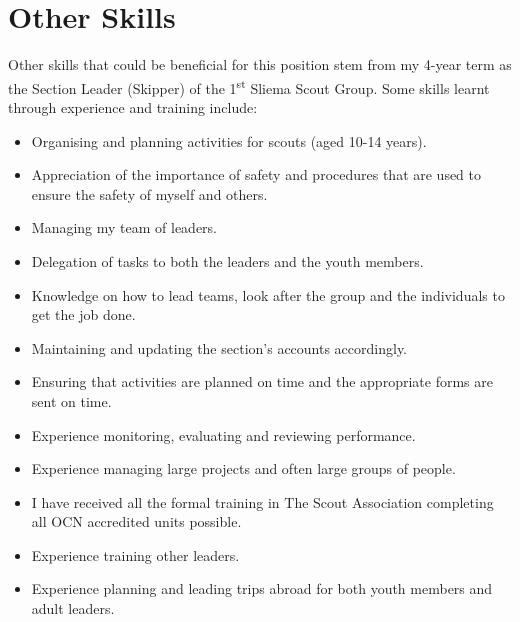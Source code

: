 \documentclass[10pt]{article}
\begin{document}
	\section*{Other Skills}
	Other skills that could be beneficial for this position stem from my 4-year term as the Section Leader (Skipper) of the 1\textsuperscript{st} Sliema Scout Group. Some skills learnt through experience and training include:
	\begin{itemize}
		\renewcommand\labelitemi{-$>$}
		\item Organising and planning activities for scouts (aged 10-14 years).
		\item Appreciation of the importance of safety and procedures that are used to ensure the safety of myself and others.
		\item Managing my team of leaders.
		\item Delegation of tasks to both the leaders and the youth members.
		\item Knowledge on how to lead teams, look after the group and the individuals to get the job done.
		\item Maintaining and updating the section's accounts accordingly. 
		\item Ensuring that activities are planned on time and the appropriate forms are sent on time.
		\item Experience monitoring, evaluating and reviewing performance.
		\item Experience managing large projects and often large groups of people.
		\item I have received all the formal training in The Scout Association completing all OCN accredited units possible.
		\item Experience training other leaders.
		\item Experience planning and leading trips abroad for both youth members and adult leaders.
	\end{itemize}
	
\end{document}
